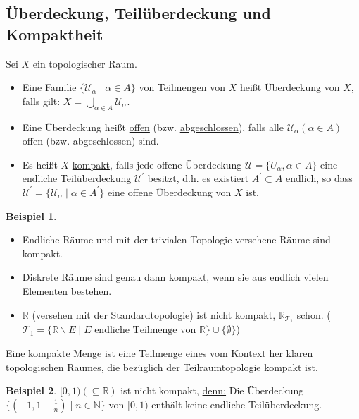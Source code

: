 \documentclass[a4paper,11pt,notitlepage]{report}
\theoremstyle{definition}
\newtheorem{example}{Beispiel}[chapter]
\newcommand{\R}{{\ensuremath{\mathbb{R}}}}
\newcommand{\N}{{\ensuremath{\mathbb{N}}}}
\begin{document}
\subsection{Überdeckung, Teilüberdeckung und Kompaktheit}
Sei $X$ ein topologischer Raum.
\begin{definition}
	\begin{itemize}
		\item Eine Familie $\{\mathcal{U}_\alpha \mid \alpha \in A \}$ von Teilmengen von $X$ heißt \underline{Überdeckung} von $X$, falls gilt: $X = \bigcup\limits_{\alpha \in A}{\mathcal{U}_\alpha}$.
		\item Eine Überdeckung heißt \underline{offen} (bzw. \underline{abgeschlossen}), falls alle $\mathcal{U}_\alpha (\alpha \in A)$ offen (bzw. abgeschlossen) sind.
		\item Es heißt $X$ \underline{kompakt}, falls jede offene Überdeckung $\mathcal{U}=\{U_\alpha, \alpha \in A\}$ eine endliche Teilüberdeckung $\mathcal{U}^\prime$ besitzt, d.h. es existiert $A^\prime \subset A$ endlich, so dass $\mathcal{U}^\prime = \{\mathcal{U}_\alpha \mid \alpha \in A^\prime \}$ eine offene Überdeckung von $X$ ist.
	\end{itemize}
\end{definition}

\begin{example}
	\begin{itemize}
		\item Endliche Räume und mit der trivialen Topologie versehene Räume sind kompakt.
		\item Diskrete Räume sind genau dann kompakt, wenn sie aus endlich vielen Elementen bestehen.
		\item $\R$ (versehen mit der Standardtopologie) ist \underline{nicht} kompakt, $\R_{\mathcal{T}_1}$ schon. ($\mathcal{T}_1 = \{ \R \backslash E \mid E \text{ endliche Teilmenge von } \R \} \cup \{\emptyset\}$)
	\end{itemize}
\end{example}

\begin{definition}	Eine \underline{kompakte Menge} ist eine Teilmenge eines vom Kontext her klaren topologischen Raumes, die bezüglich der Teilraumtopologie kompakt ist.
\end{definition}

\begin{example}
	$[0,1) (\subseteq \R)$ ist nicht kompakt, \underline{denn:} Die Überdeckung $\{(-1,1-\frac{1}{n}) \mid n \in \N \}$ von $[0,1)$ enthält keine endliche Teilüberdeckung.
\end{example}
\end{document}
